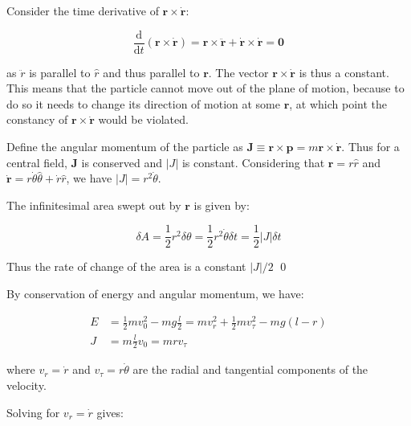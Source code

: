 \documentclass[12pt]{article}
\begin{document}
Consider the time derivative of $\mathbf{r} \times \dot{\mathbf{r}}$:

\begin{equation}
    \frac{\mathrm{d}}{\mathrm{d}t}(\mathbf{r} \times \dot{\mathbf{r}}) = \mathbf{r} \times \ddot{\mathbf{r}} + \dot{\mathbf{r}} \times \dot{\mathbf{r}} = \mathbf{0}
\end{equation}

as $\ddot{r}$ is parallel to $\hat{r}$ and thus parallel to $\mathbf{r}$. The vector $\mathbf{r} \times \dot{\mathbf{r}}$ is thus a constant. This means that the particle cannot move out of the plane of motion, because to do so it needs to change its direction of motion at some $\mathbf{r}$, at which point the constancy of $\mathbf{r} \times \dot{\mathbf{r}}$ would be violated.

Define the angular momentum of the particle as $\mathbf{J} \equiv \mathbf{r} \times \mathbf{p} = m \mathbf{r} \times \dot{\mathbf{r}}$. Thus for a central field, $\mathbf{J}$ is conserved and $\left\lvert J \right\rvert$ is constant. Considering that $\mathbf{r} = r \hat{r}$ and $\dot{\mathbf{r}} = r \dot{\theta} \hat{\theta} + \dot{r} \hat{r}$, we have $\left\lvert J \right\rvert = r^{2} \dot{\theta}$.

The infinitesimal area swept out by $\mathbf{r}$ is given by:

\begin{equation}
    \delta A = \frac{1}{2} r^{2} \delta \theta = \frac{1}{2} r^{2} \dot{\theta} \delta t = \frac{1}{2} \left\lvert J \right\rvert \delta t
\end{equation}

Thus the rate of change of the area is a constant $\left\lvert J \right\rvert/2$
\qed


By conservation of energy and angular momentum, we have:

\begin{equation}
\begin{split}
    E &= \frac{1}{2}mv_{0}^{2} - mg \frac{l}{2} = mv_{r}^{2} + \frac{1}{2}mv_{\tau}^{2}- mg(l - r) \\
    J &= m \frac{l}{2} v_{0} = mrv_{\tau}
\end{split}
\end{equation}

where $v_{r} = \dot{r}$ and $v_{\tau} = r \dot{\theta}$ are the radial and tangential components of the velocity.

Solving for $v_{r} = \dot{r}$ gives:
\end{document}
